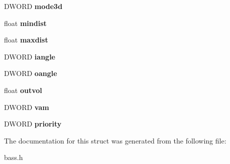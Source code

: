 \begin{DoxyCompactItemize}
\item 
\hypertarget{structBASS__SAMPLE_a20fcedf825bd2d62cff1a39dd4a79d4f}{}D\+W\+O\+R\+D {\bfseries mode3d}\label{structBASS__SAMPLE_a20fcedf825bd2d62cff1a39dd4a79d4f}

\item 
\hypertarget{structBASS__SAMPLE_aae9039af2e1e14189bc6df67c89077de}{}float {\bfseries mindist}\label{structBASS__SAMPLE_aae9039af2e1e14189bc6df67c89077de}

\item 
\hypertarget{structBASS__SAMPLE_a3e3c1c0fc99110afd6b7cebbcab1ad35}{}float {\bfseries maxdist}\label{structBASS__SAMPLE_a3e3c1c0fc99110afd6b7cebbcab1ad35}

\item 
\hypertarget{structBASS__SAMPLE_a680ef402d0a1a1f934f35aa3eb74c746}{}D\+W\+O\+R\+D {\bfseries iangle}\label{structBASS__SAMPLE_a680ef402d0a1a1f934f35aa3eb74c746}

\item 
\hypertarget{structBASS__SAMPLE_a6fac12da5e3308d9122f0f8c9e7eb181}{}D\+W\+O\+R\+D {\bfseries oangle}\label{structBASS__SAMPLE_a6fac12da5e3308d9122f0f8c9e7eb181}

\item 
\hypertarget{structBASS__SAMPLE_a8c280d4cfbc49970503b931c9e8fa4dc}{}float {\bfseries outvol}\label{structBASS__SAMPLE_a8c280d4cfbc49970503b931c9e8fa4dc}

\item 
\hypertarget{structBASS__SAMPLE_af6bf250cbb800dfff363da346074e301}{}D\+W\+O\+R\+D {\bfseries vam}\label{structBASS__SAMPLE_af6bf250cbb800dfff363da346074e301}

\item 
\hypertarget{structBASS__SAMPLE_a99f47aeb64df3819f1c419a94a911a24}{}D\+W\+O\+R\+D {\bfseries priority}\label{structBASS__SAMPLE_a99f47aeb64df3819f1c419a94a911a24}

\end{DoxyCompactItemize}


The documentation for this struct was generated from the following file\+:\begin{DoxyCompactItemize}
\item 
bass.\+h\end{DoxyCompactItemize}
